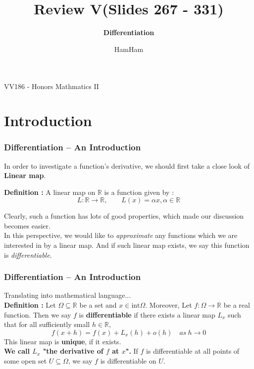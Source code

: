 \documentclass{beamer}
\title{\sffamily Review V(Slides 267 - 331)}
\subtitle{\textbf{Differentiation}\\ }
\institute[UM-SJTU JI]{University of Michigan-Shanghai Jiao Tong University Joint Institute}
\author{HamHam}
\newcommand{\myfont}{\rmfamily\normalsize\upshape\mdseries}
\begin{document}
\begin{titlepage}
    \begin{center}
        VV186 - Honors Mathmatics II
    \end{center}
\end{titlepage}
\myfont



\section{Introduction}
\begin{frame}
    \frametitle{Differentiation -- An Introduction}

In order to investigate a function's derivative, we should first take a close look of \textbf{Linear map}.

\vspace{2em}
\textbf{Definition : } A linear map on $\mathbb{R}$ is a function given by :
\begin{equation*}
    L: \mathbb{R}\rightarrow\mathbb{R}, \qquad L(x)=\alpha x, \alpha \in \mathbb{R}
\end{equation*}

\vspace{1em}
Clearly, such a function has lots of good properties, which made our discussion becomes easier.\\
\vspace{1em}
In this perspective, we would like to \emph{approximate} any functions which we are interested in by a linear map. And if 
such linear map exists, we say this function is \emph{differentiable}.
\end{frame}

\begin{frame}
    \frametitle{Differentiation -- An Introduction}
Translating into mathematical language...\\
\vspace{2em}
\textbf{Definition : } 
    Let $\Omega\subseteq\mathbb{R}$ be a set and $x\in \text{int}\Omega$. Moreover, Let $f:\Omega\rightarrow \mathbb{R}$ be a real function. 
    Then we say $f$ is \textbf{differentiable} if there exists a linear map $L_x$ such that for all sufficiently small $h\in\mathbb{R}$, 
\begin{equation*}
    f(x+h)=f(x)+L_x(h)+o(h)\quad as\ h\rightarrow 0
\end{equation*}
This linear map is \textbf{unique}, if it exists. \\
\vspace{1em}
\textbf{We call $L_x$ "the derivative of $f$ at $x$".}
 If $f$ is differentiable at all points of some open 
set $U\subseteq \Omega$, we say $f$ is differentiable on $U$. 

\end{frame}
\end{document}
